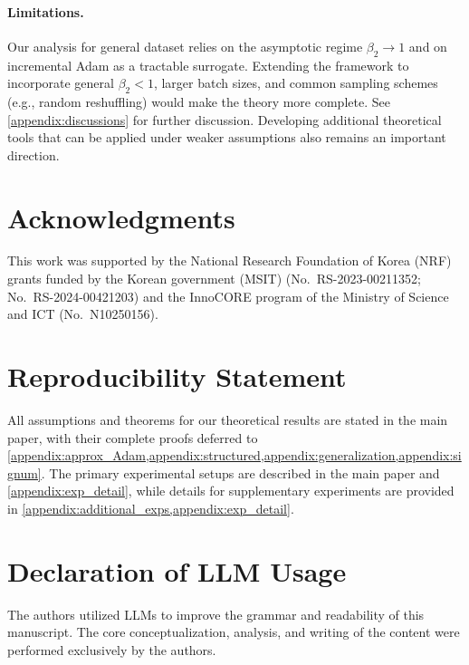 \documentclass{article} %
\theoremstyle{plain}
\theoremstyle{definition}
\theoremstyle{remark}
\begin{document}
\vspace{-3pt}
\paragraph{Limitations.}
Our analysis for general dataset relies on the asymptotic regime $\beta_2 \to 1$ and on incremental Adam as a tractable surrogate. Extending the framework to incorporate general $\beta_2<1$, larger batch sizes, and common sampling schemes (e.g., random reshuffling) would make the theory more complete. See \cref{appendix:discussions} for further discussion. Developing additional theoretical tools that can be applied under weaker assumptions also remains an important direction.  



\section*{Acknowledgments}
This work was supported by the National Research Foundation of Korea (NRF) grants funded by the Korean government (MSIT) (No.\ RS-2023-00211352; No.\ RS-2024-00421203) and the InnoCORE program of the Ministry of Science and ICT (No.\ N10250156).

\section*{Reproducibility Statement}
All assumptions and theorems for our theoretical results are stated in the main paper, with their complete proofs deferred to \cref{appendix:approx_Adam,appendix:structured,appendix:generalization,appendix:signum}. The primary experimental setups are described in the main paper and \cref{appendix:exp_detail}, while details for supplementary experiments are provided in \cref{appendix:additional_exps,appendix:exp_detail}.

\section*{Declaration of LLM Usage}
The authors utilized LLMs to improve the grammar and readability of this manuscript. The core conceptualization, analysis, and writing of the content were performed exclusively by the authors.




\newpage
\appendix

\renewcommand{\appendixpagename}{\centering \LARGE Appendix}
\appendixpage
\end{document}
